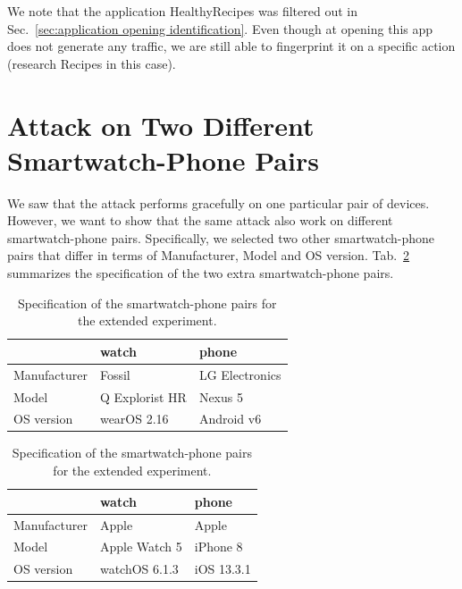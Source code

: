 We note that the application HealthyRecipes was filtered out in Sec.~\ref{sec:application opening identification}. Even though at opening this app does not generate any traffic, we are still able to fingerprint it on a specific action (research Recipes in this case).









\section{Attack on Two Different Smartwatch-Phone Pairs}
We saw that the attack performs gracefully on one particular pair of devices. However, we want to show that the same attack also work on different smartwatch-phone pairs. Specifically, we selected two other smartwatch-phone pairs that differ in terms of Manufacturer, Model and OS version. Tab.~\ref{tab:extension_watch_spec} summarizes the specification of the two extra smartwatch-phone pairs. 
\\

\begin{table}[ht]
\begin{multicols}{2}
\centering
{}
 \begin{tabular}{@{}lll@{}} 
 \toprule
  & watch & phone \\ [0.5ex] 
 \midrule
 Manufacturer & Fossil & LG Electronics \\ 

 Model & Q Explorist HR & Nexus 5  \\

 OS version & wearOS 2.16 & Android v6  \\
 \bottomrule
\end{tabular}
 \begin{tabular}{@{}lll@{}} 
 \toprule
  & watch & phone \\ [0.5ex] 
 \midrule
 Manufacturer & Apple & Apple \\ 

 Model & Apple Watch 5 & iPhone 8  \\

 OS version & watchOS 6.1.3 & iOS 13.3.1  \\
 \bottomrule
\end{tabular}

\end{multicols}
\caption{Specification of the smartwatch-phone pairs for the extended experiment.}
\label{tab:extension_watch_spec}
\end{table}


